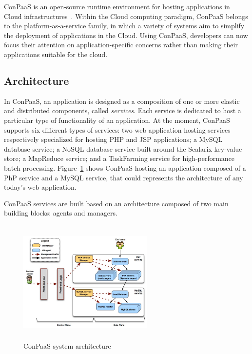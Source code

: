 

ConPaaS is an open-source runtime environment for hosting applications in Cloud infrastructures~\cite{conpaasIC}.
Within the Cloud computing paradigm, ConPaaS belongs to the platform-as-a-service family, 
in which a variety of systems aim to simplify the deployment of applications in the Cloud. Using ConPaaS,  developers can now focus their attention on application-specific concerns rather than making their applications suitable for the cloud. 

\subsection{Architecture}

In ConPaaS, an application is designed as a composition of one or more elastic and distributed components, called \emph{services}. Each service is dedicated to host a particular type of functionality of an application. At the moment, ConPaaS supports six different types of services: two web application hosting services respectively specialized for hosting PHP and JSP applications; a MySQL database service; a NoSQL database service built around the Scalarix key-value store; a MapReduce service; and a TaskFarming service for high-performance batch processing.  Figure~\ref{arch} shows ConPaaS hosting an application composed of a PhP service and a MySQL service, that could represents the architecture of any today's web application.

ConPaaS services are built based on an architecture composed of two main building blocks: agents and managers.

\begin{figure}[Ht]
\begin{center}
\includegraphics[width=0.6\textwidth, height=6.2cm]{./images/conpaasSystemArch}
\end{center}
\caption{ConPaaS system architecture}
\label{arch}
\end{figure}


